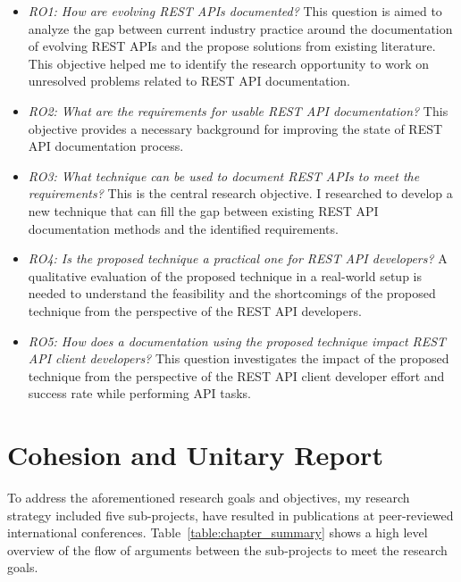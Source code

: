 \begin{itemize}
  \item \textit{RO1: How are evolving REST APIs documented?} This question is aimed to analyze the gap between current industry practice around the documentation of evolving REST APIs and the propose solutions from existing literature. This objective helped me to identify the research opportunity to work on unresolved problems related to REST API documentation.
  \item \textit{RO2: What are the requirements for usable REST API documentation?} This objective provides a necessary background for improving the state of REST API documentation process.
  \item \textit{RO3: What technique can be used to document REST APIs to meet the requirements?} This is the central research objective. I researched to develop a new technique that can fill the gap between existing REST API documentation methods and the identified requirements.
  \item \textit{RO4: Is the proposed technique a practical one for REST API developers?} A qualitative evaluation of the proposed technique in a real-world setup is needed to understand the feasibility and the shortcomings of the proposed technique from the perspective of the REST API developers.
  \item \textit{RO5: How does a documentation using the proposed technique impact REST API client developers?} This question investigates the impact of the proposed technique from the perspective of the REST API client developer effort and success rate while performing API tasks.
\end{itemize}

\section{Cohesion and Unitary Report}
To address the aforementioned research goals and objectives, my research strategy included five sub-projects, have resulted in publications at peer-reviewed international conferences. Table~\ref{table:chapter_summary} shows a high level overview of the flow of arguments between the sub-projects to meet the research goals.

